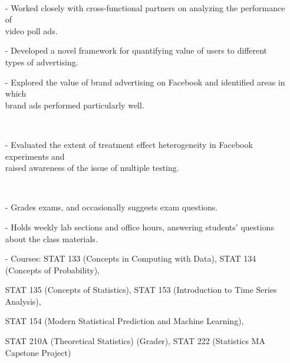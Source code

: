 \documentclass{res}
\begin{document}
\begin{resume}
     \\ 
            \begin{itemize}\setlength\itemsep{0em}
        \item[-] Worked closely with cross-functional partners on analyzing the performance of \\video poll ads. 
\item[-]  Developed a novel framework for quantifying value of users to different types of advertising. 
\item[-] Explored the value of brand advertising on Facebook and identified areas in which \\brand ads performed particularly well. 
        \end{itemize}

     \\ 
            \begin{itemize}\setlength\itemsep{0em}
        \item[-] Evaluated the extent of treatment effect heterogeneity in Facebook experiments and \\raised awareness of the issue of multiple testing.
        \end{itemize}
  

     \\ 
            \begin{itemize}\setlength\itemsep{0em}
        \item[-] Grades exams, and occasionally suggests exam questions. 
        \item[-] Holds weekly lab sections and office hours, answering students' questions about the class materials.
        \item[-] Courses: STAT 133 (Concepts in Computing with Data), STAT 134 (Concepts of Probability), 
        \item[] STAT 135 (Concepts of Statistics), 
        STAT 153 (Introduction to Time Series Analysis), 
        \item[] STAT 154 (Modern Statistical Prediction and Machine Learning), 
        \item[] STAT 210A (Theoretical Statistics) (Grader), 
         STAT 222 (Statistics MA Capstone Project)
        \end{itemize}
  

\end{resume}
\end{document}
